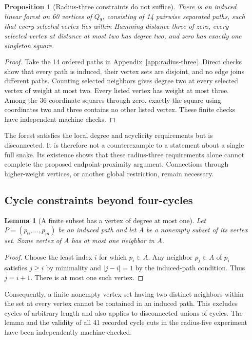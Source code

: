 \documentclass[11pt,a4paper]{article}
\newtheorem{proposition}[theorem]{Proposition}
\newtheorem{lemma}[theorem]{Lemma}
\theoremstyle{definition}
\theoremstyle{remark}
\newcommand{\Q}{Q}
\begin{document}
\begin{proposition}[Radius-three constraints do not suffice]\label{prop:radius-three}
There is an induced linear forest on 60 vertices of $\Q_9$, consisting of 14 pairwise separated paths, such that every selected vertex lies within Hamming distance three of zero, every selected vertex at distance at most two has degree two, and zero has exactly one singleton square.
\end{proposition}
\begin{proof}
Take the 14 ordered paths in Appendix~\ref{app:radius-three}. Direct checks show that every path is induced, their vertex sets are disjoint, and no edge joins different paths. Counting selected neighbors gives degree two at every selected vertex of weight at most two. Every listed vertex has weight at most three. Among the 36 coordinate squares through zero, exactly the square using coordinates two and three contains no other listed vertex. These finite checks have independent machine checks.
\end{proof}

The forest satisfies the local degree and acyclicity requirements but is disconnected. It is therefore not a counterexample to a statement about a single full snake. Its existence shows that these radius-three requirements alone cannot complete the proposed endpoint-proximity argument. Connections through higher-weight vertices, or another global restriction, remain necessary.


\subsection{Cycle constraints beyond four-cycles}
\begin{lemma}[A finite subset has a vertex of degree at most one]\label{lem:subset-low-degree}
Let $P=(p_0,\ldots,p_m)$ be an induced path and let $A$ be a nonempty subset of its vertex set. Some vertex of $A$ has at most one neighbor in $A$.
\end{lemma}
\begin{proof}
Choose the least index $i$ for which $p_i\in A$. Any neighbor $p_j\in A$ of $p_i$ satisfies $j\ge i$ by minimality and $|j-i|=1$ by the induced-path condition. Thus $j=i+1$. There is at most one such vertex.
\end{proof}
Consequently, a finite nonempty vertex set having two distinct neighbors within the set at every vertex cannot be contained in an induced path. This excludes cycles of arbitrary length and also applies to disconnected unions of cycles. The lemma and the validity of all 41 recorded cycle cuts in the radius-five experiment have been independently machine-checked.
\end{document}
